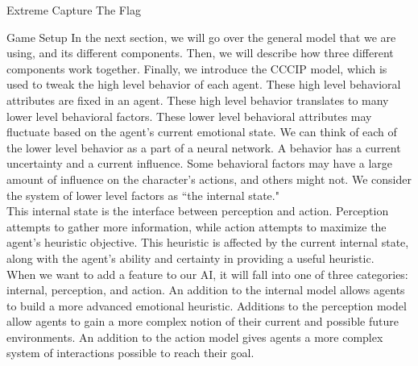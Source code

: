 \documentclass[11pt]{article}
\begin{document}
\begin{section}{Extreme Capture The Flag}
\begin{subsection}{Game Setup}
In the next section, we will go over the general model that we are using, and its different components. Then, we will describe how three different components work together. Finally, we introduce the CCCIP model, which is used to tweak the high level behavior of each agent. These high level behavioral attributes are fixed in an agent. These high level behavior translates to many lower level behavioral factors. These lower level behavioral attributes may fluctuate based on the agent's current emotional state. We can think of each of the lower level behavior as a part of a neural network. A behavior has a current uncertainty and a current influence. Some behavioral factors may have a large amount of influence on the character's actions, and others might not. We consider the system of lower level factors as ``the internal state."\\

This internal state is the interface between perception and action. Perception attempts to gather more information, while action attempts to maximize the agent's heuristic objective. This heuristic is affected by the current internal state, along with the agent's ability and certainty in providing a useful heuristic.\\

When we want to add a feature to our AI, it will fall into one of three categories: internal, perception, and action. An addition to the internal model allows agents to build a more advanced emotional heuristic. Additions to the perception model allow agents to gain a more complex notion of their current and possible future environments. An addition to the action model gives agents a more complex system of interactions possible to reach their goal.\\  
\end{subsection}
\end{section}
\end{document}
